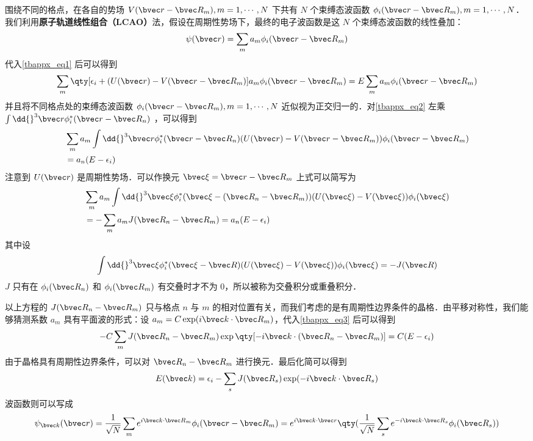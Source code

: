 围绕不同的格点，在各自的势场 $V(\bvec r-\bvec R_m),m=1,\cdots,N$ 下共有 $N$ 个束缚态波函数 $\phi_i(\bvec r-\bvec R_m),m=1,\cdots,N$．我们利用\textbf{原子轨道线性组合（LCAO）}法，假设在周期性势场下，最终的电子波函数是这 $N$ 个束缚态波函数的线性叠加：
\begin{equation}
\psi(\bvec r)=\sum_{m} a_m \phi_i(\bvec r-\bvec R_m)
\end{equation}
代入\autoref{tbappx_eq1} 后可以得到
\begin{equation}\label{tbappx_eq2}
\sum_{m}\qty[\epsilon_i+(U(\bvec r)-V(\bvec r-\bvec R_m)]a_m\phi_i(\bvec r-\bvec R_m)=E\sum_{m} a_m\phi_i(\bvec r-\bvec R_m)
\end{equation}
并且将不同格点处的束缚态波函数 $\phi_i(\bvec r-\bvec R_m),m=1,\cdots,N$ 近似视为正交归一的．对\autoref{tbappx_eq2} 左乘 $\int \dd{}^3 \bvec r\phi_i^*(\bvec r-\bvec R_n)$ ，可以得到
\begin{equation}
\begin{aligned}
&\sum_m a_m \int \dd{}^3 \bvec r \phi_i^*(\bvec r-\bvec R_n)(U(\bvec r)-V(\bvec r-\bvec R_m))\phi_i(\bvec r-\bvec R_m)\\
&=a_n(E-\epsilon_i)
\end{aligned}
\end{equation}
注意到 $U(\bvec r)$ 是周期性势场．可以作换元  $\bvec \xi=\bvec r-\bvec R_m$ 上式可以简写为
\begin{equation}\label{tbappx_eq3}
\begin{aligned}
&\sum_m a_m \int \dd{}^3 \bvec \xi \phi_i^*(\bvec \xi-(\bvec R_n-\bvec R_m))(U(\bvec \xi)-V(\bvec \xi))\phi_i(\bvec \xi)
\\
&=-\sum_m a_m J(\bvec R_n-\bvec R_m)=a_n(E-\epsilon_i)
\end{aligned}
\end{equation}
其中设
\begin{equation}\label{tbappx_eq5}
\int \dd{}^3 \bvec \xi \phi_i^*(\bvec \xi-\bvec R)(U(\bvec \xi)-V(\bvec \xi))\phi_i(\bvec \xi)=-J(\bvec R)
\end{equation}
$J$ 只有在 $\phi_i(\bvec R_n)$ 和 $\phi_i(\bvec R_m)$ 有交叠时才不为 $0$，所以被称为交叠积分或重叠积分．

以上方程的 $J(\bvec R_n-\bvec R_m)$ 只与格点 $n$ 与 $m$ 的相对位置有关，而我们考虑的是有周期性边界条件的晶格．由平移对称性，我们能够猜测系数 $a_m$ 具有平面波的形式：设 $a_m=C\exp(i \bvec k\cdot \bvec R_m)$，代入\autoref{tbappx_eq3} 后可以得到
\begin{equation}
-C\sum_m J(\bvec R_n-\bvec R_m)\exp\qty[-i\bvec k\cdot (\bvec R_n-\bvec R_m)]=C(E-\epsilon_i)
\end{equation}
由于晶格具有周期性边界条件，可以对 $\bvec R_n-\bvec R_m$ 进行换元．最后化简可以得到
\begin{equation}\label{tbappx_eq4}
E(\bvec k)=\epsilon_i-\sum_s J(\bvec R_s)\exp(-i\bvec k\cdot \bvec R_s)
\end{equation}
波函数则可以写成
\begin{equation}
\psi_{\bvec k}(\bvec r)=\frac{1}{\sqrt{N}}\sum_m e^{i\bvec k\cdot \bvec R_m}\phi_i(\bvec r-\bvec R_m)=e^{i\bvec k\cdot \bvec r}\qty(\frac{1}{\sqrt{N}}\sum_s e^{-i\bvec k\cdot \bvec R_s}\phi_i(\bvec R_s))
\end{equation}

